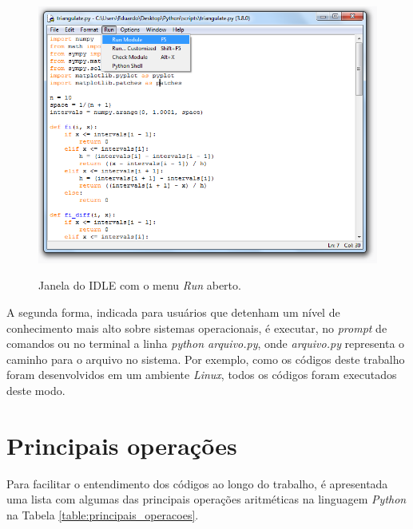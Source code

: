 \documentclass[
	12pt,				%
	openright,			%
    twoside,			%
	a4paper,			%
	chapter=TITLE,		%
	english,			%
	french,				%
	spanish,			%
	brazil				%
	]{abntex2}
\numberwithin{lema}{chapter}
\numberwithin{teorema}{chapter}
\numberwithin{definicao}{chapter}
\numberwithin{exemplo}{chapter}
\numberwithin{figure}{chapter}
\begin{document}
\begin{apendicesenv}
{	\begin{figure}[h]
		\caption{Janela do IDLE com o menu \textit{Run} aberto.}
		\centering
		\includegraphics[scale=0.6]{../figuras/python/python_runmodule.png}
		\label{fig:python_runmodule}
	\end{figure}
	
	A segunda forma, indicada para usuários que detenham um nível de conhecimento mais alto sobre sistemas operacionais, é executar, no \textit{prompt} de comandos ou no terminal a linha \textit{python arquivo.py}, onde \textit{arquivo.py} representa o caminho para o arquivo no sistema. Por exemplo, como os códigos deste trabalho foram desenvolvidos em um ambiente \textit{Linux}, todos os códigos foram executados deste modo.
	
	\section{Principais operações}
	
	Para facilitar o entendimento dos códigos ao longo do trabalho, é apresentada uma lista com algumas das principais operações aritméticas na linguagem \textit{Python} na Tabela \ref{table:principais_operacoes}.
	
}
\end{apendicesenv}
\end{document}
